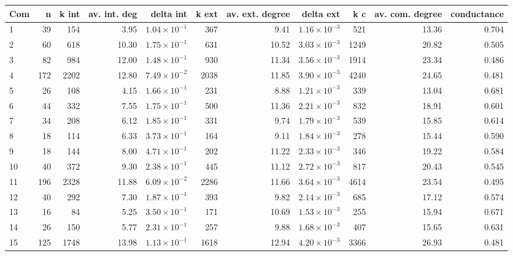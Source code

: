 \begin{table}[ht]
\centering
\begin{adjustbox}{width=\textwidth}


\begin{tabular}{lrrrrrrrrrr}
  \hline
Com & n & k int & av. int. deg & delta int & k ext & av. ext. degree & delta ext & k c & av. com. degree & conductance \\ 
  \hline
1 & 39 & 154 & 3.95 & $1.04 \times 10^{-1}$ & 367 & 9.41 & $1.16 \times 10^{-3}$ & 521 & 13.36 & 0.704 \\ 
  2 & 60 & 618 & 10.30 & $1.75 \times 10^{-1}$ & 631 & 10.52 & $3.03 \times 10^{-3}$ & 1249 & 20.82 & 0.505 \\ 
  3 & 82 & 984 & 12.00 & $1.48 \times 10^{-1}$ & 930 & 11.34 & $3.56 \times 10^{-3}$ & 1914 & 23.34 & 0.486 \\ 
  4 & 172 & 2202 & 12.80 & $7.49 \times 10^{-2}$ & 2038 & 11.85 & $3.90 \times 10^{-3}$ & 4240 & 24.65 & 0.481 \\ 
  5 & 26 & 108 & 4.15 & $1.66 \times 10^{-1}$ & 231 & 8.88 & $1.21 \times 10^{-3}$ & 339 & 13.04 & 0.681 \\ 
  6 & 44 & 332 & 7.55 & $1.75 \times 10^{-1}$ & 500 & 11.36 & $2.21 \times 10^{-3}$ & 832 & 18.91 & 0.601 \\ 
  7 & 34 & 208 & 6.12 & $1.85 \times 10^{-1}$ & 331 & 9.74 & $1.79 \times 10^{-3}$ & 539 & 15.85 & 0.614 \\ 
  8 & 18 & 114 & 6.33 & $3.73 \times 10^{-1}$ & 164 & 9.11 & $1.84 \times 10^{-3}$ & 278 & 15.44 & 0.590 \\ 
  9 & 18 & 144 & 8.00 & $4.71 \times 10^{-1}$ & 202 & 11.22 & $2.33 \times 10^{-3}$ & 346 & 19.22 & 0.584 \\ 
  10 & 40 & 372 & 9.30 & $2.38 \times 10^{-1}$ & 445 & 11.12 & $2.72 \times 10^{-3}$ & 817 & 20.43 & 0.545 \\ 
  11 & 196 & 2328 & 11.88 & $6.09 \times 10^{-2}$ & 2286 & 11.66 & $3.64 \times 10^{-3}$ & 4614 & 23.54 & 0.495 \\ 
  12 & 40 & 292 & 7.30 & $1.87 \times 10^{-1}$ & 393 & 9.82 & $2.14 \times 10^{-3}$ & 685 & 17.12 & 0.574 \\ 
  13 & 16 & 84 & 5.25 & $3.50 \times 10^{-1}$ & 171 & 10.69 & $1.53 \times 10^{-3}$ & 255 & 15.94 & 0.671 \\ 
  14 & 26 & 150 & 5.77 & $2.31 \times 10^{-1}$ & 257 & 9.88 & $1.68 \times 10^{-3}$ & 407 & 15.65 & 0.631 \\ 
  15 & 125 & 1748 & 13.98 & $1.13 \times 10^{-1}$ & 1618 & 12.94 & $4.20 \times 10^{-3}$ & 3366 & 26.93 & 0.481 \\ 

\end{tabular}
\end{adjustbox}
\end{table}

